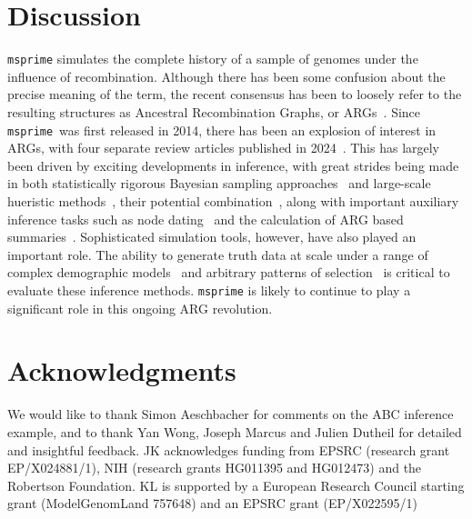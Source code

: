 \documentclass[graybox]{svmult}
\newcommand{\msprime}[0]{\texttt{msprime}}
\begin{document}
\section{Discussion}
\label{sec:discussion}
\texttt{msprime} simulates the complete history of a sample of genomes under
the influence of recombination. Although there has been some confusion about
the precise meaning of the term, the recent consensus has been to loosely
refer to the resulting structures as Ancestral Recombination Graphs, or
ARGs~\citep{wong2024general}. Since \msprime\ was first released in 2014,
there has been an explosion of interest in ARGs, with four separate
review articles published in 2024~\citep{brandt2024promise,
lewanski2024era,nielsen2024inference,wong2024general}.
This has largely been driven by exciting developments in inference, with great strides being
made in both statistically rigorous Bayesian sampling
approaches~\citep{rasmussen2014genome,mahmoudi2022bayesian,deng2024robust}
and large-scale hueristic
methods~\cite{speidel2019method,kelleher2019inferring,
zhang2023biobank,gunnarsson2024scalable},
their potential combination~\citep{bisschop2025likelihoods},
along with important auxiliary inference tasks such as node
dating~\cite{wohns2022unified,deng2025general} and the calculation of ARG based summaries~\cite{ignatieva2025haplotype}.
Sophisticated simulation tools, however, have also played an important
role. The ability to generate truth data at scale
under a range of complex demographic
models~\citep{adrion2020stdpopsim,gower2022demes,lauterbur2023expanding}
and arbitrary patterns of
selection~\citep{kelleher2018efficient,haller2018tree,gower2025accessible}
is critical to evaluate these inference methods.
\texttt{msprime} is likely to continue to play a significant role
in this ongoing ARG revolution.

\section*{Acknowledgments}

We would like to thank Simon Aeschbacher for comments on the ABC inference example,
and to thank Yan Wong, Joseph Marcus and Julien Dutheil for
detailed and insightful feedback.
JK acknowledges funding from EPSRC (research grant EP/X024881/1),
NIH (research grants HG011395 and HG012473)
and the Robertson Foundation.
KL is supported by a European Research Council starting grant (ModelGenomLand 757648) and an EPSRC grant (EP/X022595/1)
\end{document}
